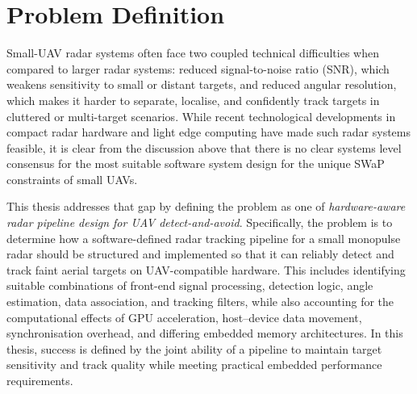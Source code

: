 \section{Problem Definition}
Small-UAV radar systems often face two coupled technical difficulties when compared to larger radar systems: reduced signal-to-noise ratio (SNR), which weakens sensitivity to small or distant targets, and reduced angular resolution, which makes it harder to separate, localise, and confidently track targets in cluttered or multi-target scenarios. While recent technological developments in compact radar hardware and light edge computing have made such radar systems feasible, it is clear from the discussion above that there is no clear systems level consensus for the most suitable software system design for the unique SWaP constraints of small UAVs. 

This thesis addresses that gap by defining the problem as one of \emph{hardware-aware radar pipeline design for UAV detect-and-avoid}. Specifically, the problem is to determine how a software-defined radar tracking pipeline for a small monopulse radar should be structured and implemented so that it can reliably detect and track faint aerial targets on UAV-compatible hardware. This includes identifying suitable combinations of front-end signal processing, detection logic, angle estimation, data association, and tracking filters, while also accounting for the computational effects of GPU acceleration, host--device data movement, synchronisation overhead, and differing embedded memory architectures. In this thesis, success is defined by the joint ability of a pipeline to maintain target sensitivity and track quality while meeting practical embedded performance requirements.






